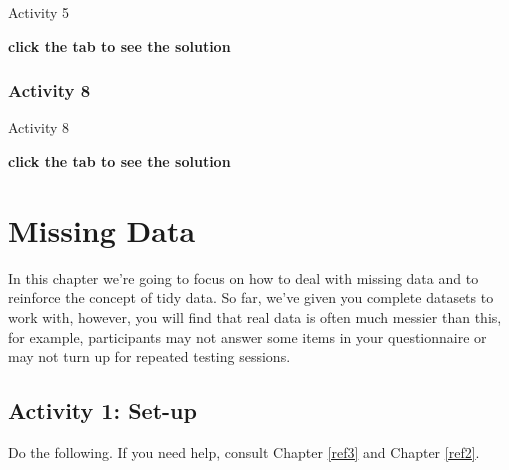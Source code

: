 \documentclass[]{book}
\newenvironment{Shaded}{\begin{snugshade}}{\end{snugshade}}
\newcommand{\DataTypeTok}[1]{\textcolor[rgb]{0.13,0.29,0.53}{#1}}
\newcommand{\KeywordTok}[1]{\textcolor[rgb]{0.13,0.29,0.53}{\textbf{#1}}}
\newcommand{\NormalTok}[1]{#1}
\newcommand{\OperatorTok}[1]{\textcolor[rgb]{0.81,0.36,0.00}{\textbf{#1}}}
\newcommand{\StringTok}[1]{\textcolor[rgb]{0.31,0.60,0.02}{#1}}
\begin{document}
Activity 5

\begin{Shaded}
\end{Shaded}

\textbf{click the tab to see the solution}

\hypertarget{activity-8-2}{%
\subsection{Activity 8}\label{activity-8-2}}

Activity 8

\begin{Shaded}
\end{Shaded}

\textbf{click the tab to see the solution}

\hypertarget{missing-data}{%
\chapter{Missing Data}\label{missing-data}}

In this chapter we're going to focus on how to deal with missing data and to reinforce the concept of tidy data. So far, we've given you complete datasets to work with, however, you will find that real data is often much messier than this, for example, participants may not answer some items in your questionnaire or may not turn up for repeated testing sessions.

\hypertarget{activity-1-set-up-6}{%
\section{Activity 1: Set-up}\label{activity-1-set-up-6}}

Do the following. If you need help, consult Chapter \ref{ref3} and Chapter \ref{ref2}.
\end{document}
